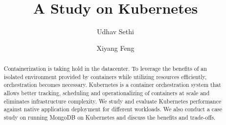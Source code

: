 \documentclass[sigconf]{acmart}
\begin{document}
\title{A Study on Kubernetes}


\author{Udhav Sethi}

\author{Xiyang Feng}


\begin{abstract}
Containerization is taking hold in the datacenter. To leverage the benefits of an isolated environment provided by containers while utilizing resources efficiently, orchestration becomes necessary. Kubernetes is a container orchestration system that allows better tracking, scheduling and operationalizing of containers at scale and eliminates infrastructure complexity. We study and evaluate Kubernetes performance against native application deployment for different workloads. We also conduct a case study on running MongoDB on Kubernetes and discuss the benefits and trade-offs.
\end{abstract}

\end{document}
